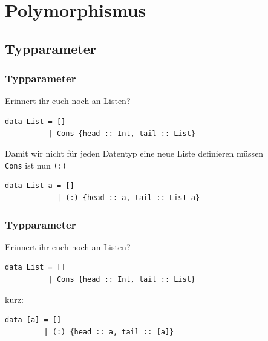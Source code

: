 \section{Polymorphismus}
\subsection{Typparameter}

\begin{frame}[fragile]
\frametitle{Typparameter}
\begin{block}{Erinnert ihr euch noch an Listen?}
\begin{lstlisting}
data List = []
          | Cons {head :: Int, tail :: List}
\end{lstlisting}
\end{block}
\pause[1]
\begin{block}{Damit wir nicht für jeden Datentyp eine neue Liste definieren müssen\\
\lstinline|Cons| ist nun \lstinline|(:)|}
\begin{lstlisting}
data List a = []
            | (:) {head :: a, tail :: List a}
\end{lstlisting}
\end{block}
\end{frame}

\begin{frame}[fragile]
\frametitle{Typparameter}
\begin{block}{Erinnert ihr euch noch an Listen?}
\begin{lstlisting}
data List = []
          | Cons {head :: Int, tail :: List}
\end{lstlisting}
\end{block}
\begin{block}{kurz:}
\begin{lstlisting}
data [a] = []
         | (:) {head :: a, tail :: [a]}
\end{lstlisting}
\end{block}
\end{frame}


